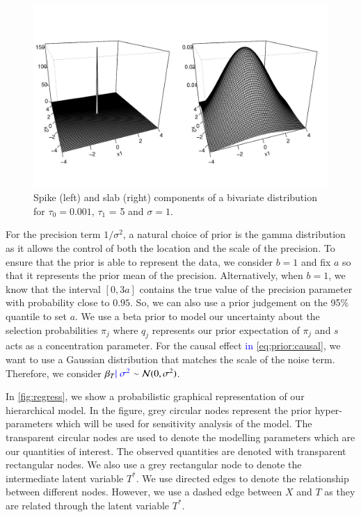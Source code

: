 \documentclass[preprint,12pt]{elsarticle}
\newcommand{\normal}{\mathcal{N}}
\newcommand{\added}[1]{\textcolor{blue}{#1}}
\begin{document}
\begin{figure}[h]
	\begin{center}
		\includegraphics[width = 0.95\linewidth]{spike_slab_bi.pdf}
	\end{center}
	\caption{Spike (left) and slab (right) components of a bivariate distribution for $\tau_0 = 0.001$, $\tau_1$ = 5 and $\sigma=1$.}
	\label{fig:ssbl}
\end{figure}

For the precision term $1/\sigma^2$, a natural choice of prior is the gamma distribution
as it allows the control of both the location and the scale of the precision.
To ensure that the prior is able to represent the data, we consider $b=1$ and 
fix $a$ so that it represents the prior mean of the precision.
Alternatively, when $b=1$, we know that the interval
$[0, 3a]$ contains the true value of the precision parameter with probability close to $0.95$.
So, we can also use a prior judgement on the 95\% quantile to set $a$.
We use a beta prior to
model our uncertainty about
the selection probabilities $\pi_j$ where  $q_j$ represents our prior expectation of $\pi_j$ and $s$ acts as 
a concentration parameter.
For the causal effect \added{in \cref{eq:prior:causal}}, we want to use a Gaussian distribution that 
matches the scale of the noise term. Therefore, we consider $\beta_T\added{\mid\sigma^2}\sim \normal(0,\sigma^2)$. 

In \cref{fig:regress}, we show a probabilistic graphical representation
of our hierarchical model. In the figure, grey circular nodes represent the
prior hyper-parameters which will be used for sensitivity analysis
of the model. The transparent circular nodes are used to denote
the modelling parameters which are our quantities of interest. 
The observed quantities are denoted with transparent rectangular
nodes. We also use a grey rectangular node to denote the intermediate
latent variable $T^*$. We use directed edges to denote the
relationship between different nodes. However, we use a dashed
edge between $X$ and $T$ as they are related through the latent
variable $T^*$. 
\end{document}
